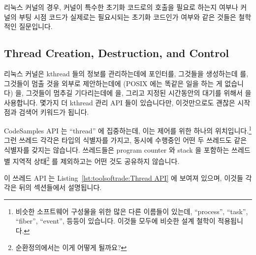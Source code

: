 리눅스 커널의 경우, 커널이 특수한 초기화 코드로의 호출을 필요로 하는지 여부나
커널의 부팅 시점 코드가 실제로는 필요시되는 초기화 코드인가 여부와 같은 것들은
철학적인 질문입니다.

\subsection{Thread Creation, Destruction, and Control}
\label{sec:toolsoftrade:Thread Creation, Destruction, and Control}

리눅스 커널은 kthread 들의 정보를 관리하는데에 
포인터를, 그것들을 생성하는데  를, 그것들이 멈출 것을
외부로 제안하는데에 (POSIX 에는 똑같은 일을 하는 게 없습니다)
 을, 그것들이 멈추길 기다리는데에 
을, 그리고 지정된 시간동안의 대기를 위해서
 을 사용합니다.
몇가지 더 kthread 관리 API 들이 있습니다만, 이것만으로도 괜찮은 시작점과 검색어
키워드가 됩니다.

CodeSamples API 는 ``thread'' 에 집중하는데, 이는 제어를 위한 하나의
위치입니다.\footnote{
	비슷한 소프트웨어 구성물을 위한 많은 다른 이름들이 있는데, ``process'',
	``task'', ``fiber'', ``event'', 등등이 있습니다.
	이것들 모두에 비슷한 설계 철학이 적용됩니다.}
그런 쓰레드 각각은  타입의 식별자를 가지고, 동시에 수행중인
어떤 두 쓰레드도 같은 식별자를 갖지는 않습니다.
쓰레드들은 program counter 와 stack 을 포함하는 쓰레드별 지역적 상태\footnote{
	순환정의에서는 이게 어떻게 될까요?}
를 제외하고는 어떤 것도 공유하지 않습니다.

이 쓰레드 API 는
Listing~\ref{lst:toolsoftrade:Thread API} 에 보여져 있으며, 이것들 각각은 뒤의
섹션들에서 설명됩니다.
\iffalse

